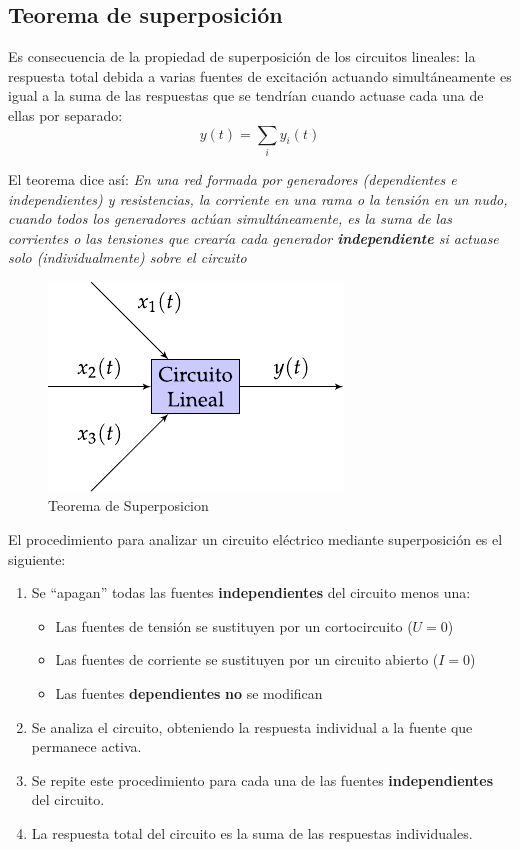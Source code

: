 \subsection{Teorema de superposición}
\label{sec:superposicion}

Es consecuencia de la propiedad de superposición de los circuitos
lineales: la respuesta total debida a varias fuentes de
excitación actuando simultáneamente es igual a la suma de las
respuestas que se tendrían cuando actuase cada una de ellas por
separado:
\begin{equation*}
  y(t) = \sum_i y_i(t)
\end{equation*}
    
El teorema dice así: \textit{En una red formada por generadores
  (dependientes e independientes) y resistencias, la corriente en una
  rama o la tensión en un nudo, cuando todos los generadores actúan
  simultáneamente, es la suma de las corrientes o las tensiones que
  crearía cada generador \textbf{independiente} si actuase solo
  (individualmente) sobre el circuito}

\begin{figure}[H]
  \centering
  \includegraphics{../figs/superposicion.pdf}
  \caption{Teorema de Superposicion}
  \label{fig:superposicion}
\end{figure}

El procedimiento para analizar un circuito eléctrico mediante
superposición es el siguiente:
\begin{enumerate}
\item Se ``apagan'' todas las fuentes \textbf{independientes} del
  circuito menos una:
  \begin{itemize}
  \item Las fuentes de tensión se sustituyen por un cortocircuito
    ($U = 0$)
  \item Las fuentes de corriente se sustituyen por un circuito abierto
    ($I = 0$)
  \item Las fuentes \textbf{dependientes} \textbf{no} se modifican
  \end{itemize}
\item Se analiza el circuito, obteniendo la respuesta individual a la
  fuente que permanece activa.
\item Se repite este procedimiento para cada una de las fuentes
  \textbf{independientes} del circuito.
\item La respuesta total del circuito es la suma de las respuestas
  individuales.
\end{enumerate}

